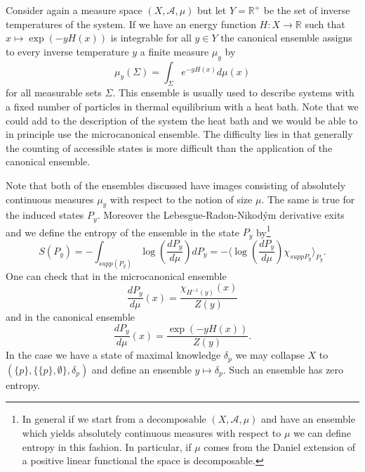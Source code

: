 \begin{example}\label{ex:canonical_ensemble}
Consider again a measure space $(X,\mathcal{A},\mu)$ but let $Y=\mathbb{R}^+$ be the set of inverse temperatures of the system. If we have an energy function $H:X\rightarrow \mathbb{R}$ such that $x\mapsto \exp(-y H(x))$ is integrable for all $y \in Y$ the canonical ensemble assigns to every inverse temperature $y$ a finite measure $\mu_y$ by
\begin{equation}
\mu_y(\Sigma)=\int_\Sigma e^{-y H(x)}d\mu(x)
\end{equation}
for all measurable sets $\Sigma$. This ensemble is usually used to describe systems with a fixed number of particles in thermal equilibrium with a heat bath. Note that we could add to the description of the system the heat bath and we would be able to in principle use the microcanonical ensemble. The difficulty lies in that generally the counting of accessible states is more difficult than the application of the canonical ensemble.
\end{example}

Note that both of the ensembles discussed have images consisting of absolutely continuous measures $\mu_y$ with respect to the notion of size $\mu$. The same is true for the induced states $P_y$. Moreover the Lebesgue-Radon-Nikodým derivative exits and we define the entropy of the ensemble in the state $P_y$ by\footnote{In general if we start from a decomposable $(X,\mathcal{A},\mu)$ and have an ensemble which yields absolutely continuous measures with respect to $\mu$ we can define entropy in this fashion. In particular, if $\mu$ comes from the Daniel extension of a positive linear functional the space is decomposable\cite{Hewitt1975}.}
\begin{equation}
S(P_y)=-\int_{supp(P_y)} \log\left(\frac{dP_y}{d\mu}\right)dP_y=-\langle\log\left(\frac{dP_y}{d\mu}\right)\chi_{supp P_y}\rangle_{P_y}.
\end{equation}
One can check that in the microcanonical ensemble 
\begin{equation}
\frac{dP_y}{d\mu}(x)=\frac{\chi_{H^{-1}(y)}(x)}{Z(y)}
\end{equation}
and in the canonical ensemble 
\begin{equation}
\frac{dP_y}{d\mu}(x)=\frac{\exp(-yH(x))}{Z(y)}. 
\end{equation}
In the case we have a state of maximal knowledge $\delta_p$ we may collapse $X$ to $(\{p\},\{\{p\},\emptyset\},\delta_p)$ and define an ensemble $y\mapsto \delta_p$. Such an ensemble has zero entropy.

